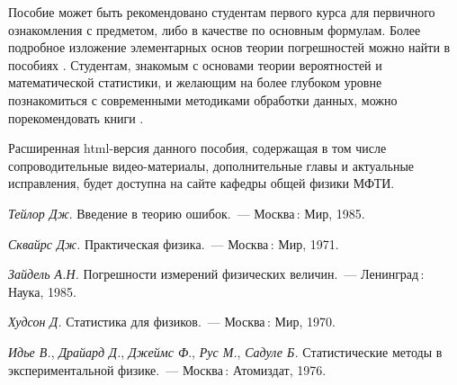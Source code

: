 \documentclass[a5paper,10pt,oneside]{report}
\begin{document}
    Пособие может быть рекомендовано студентам первого курса для первичного
    ознакомления с предметом, либо в качестве 
    по основным формулам. Более подробное
    изложение элементарных основ теории погрешностей можно найти в пособиях \cite{taylor,squires,zaidel}. 
    Студентам, знакомым с основами теории вероятностей и математической 
    статистики, и желающим на более глубоком уровне познакомиться с современными методиками обработки данных, можно порекомендовать книги \cite{hudson,idie}.
    
    Расширенная html-версия данного пособия, содержащая в том числе 
    сопроводительные видео-материалы, дополнительные главы и
    актуальные исправления, будет доступна на сайте кафедры общей физики МФТИ.









% 

%

\begin{thebibliography}{1}

 \textit{Тейлор Дж}. Введение в теорию ошибок.~---
    Москва\,: Мир, 1985.

 \textit{Сквайрс Дж.} Практическая физика.~--- Москва\,: Мир, 1971.

 \textit{Зайдель А.Н.} 
Погрешности измерений физических величин.~--- Ленинград\,: Наука, 1985.


 \textit{Худсон Д.} Статистика для физиков.~---
    Москва\,: Мир, 1970.

 \textit{Идье В.}, \textit{Драйард Д.}, \textit{Джеймс Ф}., \textit{Рус М.}, \textit{Садуле Б.} Статистические методы в экспериментальной физике.~--- Москва\,: Атомиздат, 1976. 


\end{thebibliography}
\end{document}
